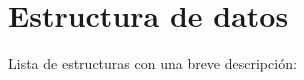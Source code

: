 \section{Estructura de datos}
Lista de estructuras con una breve descripción\+:\begin{DoxyCompactList}
\item{}
\item{}
\end{DoxyCompactList}
